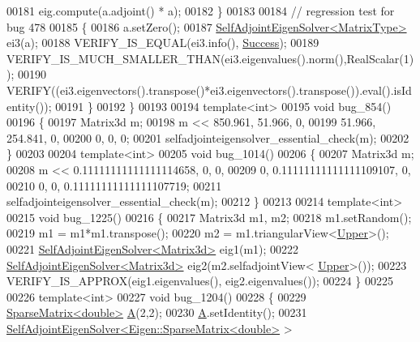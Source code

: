 \begin{DoxyCode}
00181     eig.compute(a.adjoint() * a);
00182   \}
00183 
00184   \textcolor{comment}{// regression test for bug 478}
00185   \{
00186     a.setZero();
00187     \hyperlink{group___eigenvalues___module_class_eigen_1_1_self_adjoint_eigen_solver}{SelfAdjointEigenSolver<MatrixType>} ei3(a);
00188     VERIFY\_IS\_EQUAL(ei3.info(), \hyperlink{group__enums_gga85fad7b87587764e5cf6b513a9e0ee5ea52581b035f4b59c203b8ff999ef5fcea}{Success});
00189     VERIFY\_IS\_MUCH\_SMALLER\_THAN(ei3.eigenvalues().norm(),RealScalar(1));
00190     VERIFY((ei3.eigenvectors().transpose()*ei3.eigenvectors().transpose()).eval().isIdentity());
00191   \}
00192 \}
00193 
00194 \textcolor{keyword}{template}<\textcolor{keywordtype}{int}>
00195 \textcolor{keywordtype}{void} bug\_854()
00196 \{
00197   Matrix3d m;
00198   m << 850.961, 51.966, 0,
00199        51.966, 254.841, 0,
00200             0,       0, 0;
00201   selfadjointeigensolver\_essential\_check(m);
00202 \}
00203 
00204 \textcolor{keyword}{template}<\textcolor{keywordtype}{int}>
00205 \textcolor{keywordtype}{void} bug\_1014()
00206 \{
00207   Matrix3d m;
00208   m <<        0.11111111111111114658, 0, 0,
00209        0,     0.11111111111111109107, 0,
00210        0, 0,  0.11111111111111107719;
00211   selfadjointeigensolver\_essential\_check(m);
00212 \}
00213 
00214 \textcolor{keyword}{template}<\textcolor{keywordtype}{int}>
00215 \textcolor{keywordtype}{void} bug\_1225()
00216 \{
00217   Matrix3d m1, m2;
00218   m1.setRandom();
00219   m1 = m1*m1.transpose();
00220   m2 = m1.triangularView<\hyperlink{group__enums_gga39e3366ff5554d731e7dc8bb642f83cda6bcb58be3b8b8ec84859ce0c5ac0aaec}{Upper}>();
00221   \hyperlink{group___eigenvalues___module_class_eigen_1_1_self_adjoint_eigen_solver}{SelfAdjointEigenSolver<Matrix3d>} eig1(m1);
00222   \hyperlink{group___eigenvalues___module_class_eigen_1_1_self_adjoint_eigen_solver}{SelfAdjointEigenSolver<Matrix3d>} eig2(m2.selfadjointView<
      \hyperlink{group__enums_gga39e3366ff5554d731e7dc8bb642f83cda6bcb58be3b8b8ec84859ce0c5ac0aaec}{Upper}>());
00223   VERIFY\_IS\_APPROX(eig1.eigenvalues(), eig2.eigenvalues());
00224 \}
00225 
00226 \textcolor{keyword}{template}<\textcolor{keywordtype}{int}>
00227 \textcolor{keywordtype}{void} bug\_1204()
00228 \{
00229   \hyperlink{group___sparse_core___module}{SparseMatrix<double>} \hyperlink{group___core___module_class_eigen_1_1_matrix}{A}(2,2);
00230   \hyperlink{group___core___module_class_eigen_1_1_matrix}{A}.setIdentity();
00231   \hyperlink{group___eigenvalues___module_class_eigen_1_1_self_adjoint_eigen_solver}{SelfAdjointEigenSolver<Eigen::SparseMatrix<double>} > 

\end{DoxyCode}
